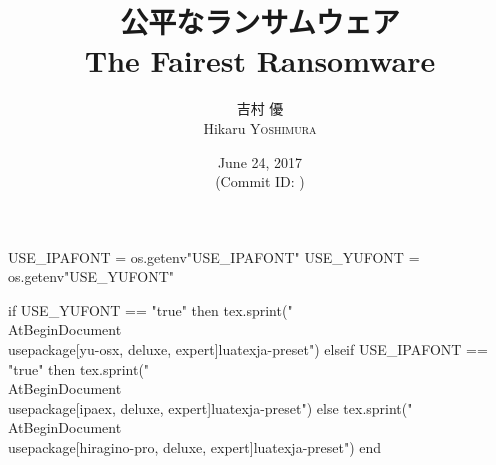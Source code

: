 \hypersetup{colorlinks,linkcolor=,urlcolor=links}

\beamertemplatenavigationsymbolsempty


\usepackage{luacode}
\usepackage{luatexja}
\usepackage{pgfpages}

\begin{luacode*}
  USE_IPAFONT = os.getenv"USE_IPAFONT"
  USE_YUFONT = os.getenv"USE_YUFONT"
  
  if USE_YUFONT == "true" then
    tex.sprint("\\AtBeginDocument{\\usepackage[yu-osx, deluxe, expert]{luatexja-preset}}")
  elseif USE_IPAFONT == "true" then
    tex.sprint("\\AtBeginDocument{\\usepackage[ipaex, deluxe, expert]{luatexja-preset}}")
  else
    tex.sprint("\\AtBeginDocument{\\usepackage[hiragino-pro, deluxe, expert]{luatexja-preset}}")
  end
\end{luacode*}

\usepackage{epigraph}
\usepackage{etoolbox}
\usepackage{tikz}
\usepackage{framed}
\usepackage{libertine}
\usepackage{amsmath}
\usepackage{mathtools}
\usepackage{listings}
\usepackage{tikz-qtree}

\renewcommand{\kanjifamilydefault}{\gtdefault}


\setmainfont[Ligatures=TeX]{Linux Libertine O}
\setsansfont[Ligatures=TeX]{CMU Sans Serif}
\setmonofont[Ligatures=TeX]{CMU Typewriter Text}



\title[公平なランサムウェア]{%
  公平なランサムウェア \\
  {\large The Fairest Ransomware}
}
\author[吉村 優]{%
  吉村 優 \\
  Hikaru \textsc{Yoshimura}
}
\date[June 24, 2017]{%
  June 24, 2017 \\%
  {\footnotesize (Commit ID: \GITAbrHash)}
}






